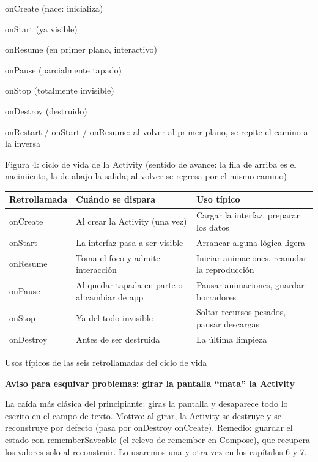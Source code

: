 onCreate (nace: inicializa)

onStart (ya visible)

onResume (en primer plano, interactivo)

onPause (parcialmente tapado)

onStop (totalmente invisible)

onDestroy (destruido)

onRestart / onStart / onResume: al volver al primer plano, se repite el camino a la inversa

\begin{center}\small\color{gray}Figura 4: ciclo de vida de la Activity (sentido de avance: la fila de arriba es el nacimiento, la de abajo la salida; al volver se regresa por el mismo camino)\end{center}

\begin{center}
\begin{tabularx}{\linewidth}{|X|X|X|}
\hline
\textbf{Retrollamada} & \textbf{Cuándo se dispara} & \textbf{Uso típico} \tabularnewline
\hline
onCreate & Al crear la Activity (una vez) & Cargar la interfaz, preparar los datos \tabularnewline
onStart & La interfaz pasa a ser visible & Arrancar alguna lógica ligera \tabularnewline
onResume & Toma el foco y admite interacción & Iniciar animaciones, reanudar la reproducción \tabularnewline
onPause & Al quedar tapada en parte o al cambiar de app & Pausar animaciones, guardar borradores \tabularnewline
onStop & Ya del todo invisible & Soltar recursos pesados, pausar descargas \tabularnewline
onDestroy & Antes de ser destruida & La última limpieza \tabularnewline
\hline
\end{tabularx}
\end{center}

\begin{center}\small\color{gray}Usos típicos de las seis retrollamadas del ciclo de vida\end{center}

\textbf{Aviso para esquivar problemas: girar la pantalla “mata” la Activity}\par

La caída más clásica del principiante: giras la pantalla y desaparece todo lo escrito en el campo de texto. Motivo: al girar, la Activity se destruye y se reconstruye por defecto (pasa por onDestroy onCreate). Remedio: guardar el estado con rememberSaveable (el relevo de remember en Compose), que recupera los valores solo al reconstruir. Lo usaremos una y otra vez en los capítulos 6 y 7.

